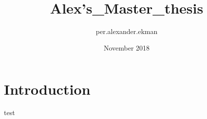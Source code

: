 \documentclass{article}
\title{Alex's_Master_thesis}
\author{per.alexander.ekman }
\date{November 2018}
\begin{document}
\maketitle

\section{Introduction}
test
\end{document}
